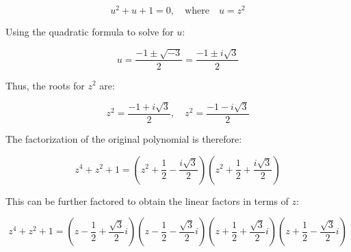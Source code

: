 \[
u^2 + u + 1 = 0, \quad \text{where} \quad u = z^2
\]

Using the quadratic formula to solve for \( u \):

\[
u = \frac{-1 \pm \sqrt{-3}}{2} = \frac{-1 \pm i\sqrt{3}}{2}
\]

Thus, the roots for \( z^2 \) are:

\[
z^2 = \frac{-1 + i\sqrt{3}}{2}, \quad z^2 = \frac{-1 - i\sqrt{3}}{2}
\]

The factorization of the original polynomial is therefore:

\[
z^4 + z^2 + 1 = \left(z^2 + \frac{1}{2} - \frac{i\sqrt{3}}{2}\right)\left(z^2 + \frac{1}{2} + \frac{i\sqrt{3}}{2}\right)
\]

This can be further factored to obtain the linear factors in terms of \( z \):

\[
z^4 + z^2 + 1 = \left(z - \frac{1}{2} + \frac{\sqrt{3}}{2}i\right)\left(z - \frac{1}{2} - \frac{\sqrt{3}}{2}i\right)\left(z + \frac{1}{2} + \frac{\sqrt{3}}{2}i\right)\left(z + \frac{1}{2} - \frac{\sqrt{3}}{2}i\right)
\]

